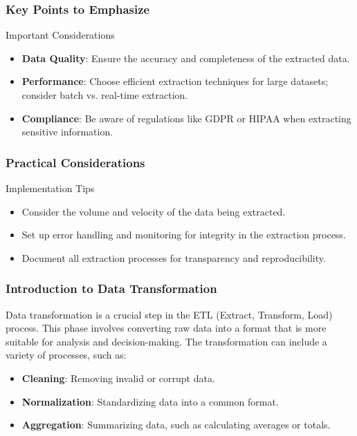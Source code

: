 \documentclass[aspectratio=169]{beamer}
\begin{document}
\begin{frame}
    \frametitle{Key Points to Emphasize}
    \begin{block}{Important Considerations}
        \begin{itemize}
            \item \textbf{Data Quality}: Ensure the accuracy and completeness of the extracted data.
            \item \textbf{Performance}: Choose efficient extraction techniques for large datasets; consider batch vs. real-time extraction.
            \item \textbf{Compliance}: Be aware of regulations like GDPR or HIPAA when extracting sensitive information.
        \end{itemize}
    \end{block}
\end{frame}

\begin{frame}
    \frametitle{Practical Considerations}
    \begin{block}{Implementation Tips}
        \begin{itemize}
            \item Consider the volume and velocity of the data being extracted.
            \item Set up error handling and monitoring for integrity in the extraction process.
            \item Document all extraction processes for transparency and reproducibility.
        \end{itemize}
    \end{block}
\end{frame}

\begin{frame}
    \titlepage
\end{frame}

\begin{frame}
    \frametitle{Introduction to Data Transformation}
    Data transformation is a crucial step in the ETL (Extract, Transform, Load) process. This phase involves converting raw data into a format that is more suitable for analysis and decision-making. The transformation can include a variety of processes, such as:
    
    \begin{itemize}
        \item \textbf{Cleaning}: Removing invalid or corrupt data.
        \item \textbf{Normalization}: Standardizing data into a common format.
        \item \textbf{Aggregation}: Summarizing data, such as calculating averages or totals.
    \end{itemize}
\end{frame}
\end{document}
